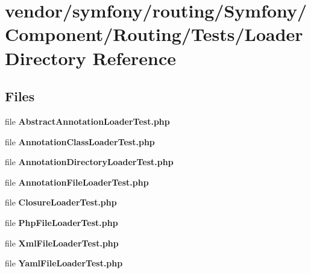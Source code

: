 \section{vendor/symfony/routing/\+Symfony/\+Component/\+Routing/\+Tests/\+Loader Directory Reference}
\label{dir_883c4e37e37910a8731378c3a2102f63}
\subsection*{Files}
\begin{DoxyCompactItemize}
\item 
file {\bf Abstract\+Annotation\+Loader\+Test.\+php}
\item 
file {\bf Annotation\+Class\+Loader\+Test.\+php}
\item 
file {\bf Annotation\+Directory\+Loader\+Test.\+php}
\item 
file {\bf Annotation\+File\+Loader\+Test.\+php}
\item 
file {\bf Closure\+Loader\+Test.\+php}
\item 
file {\bf Php\+File\+Loader\+Test.\+php}
\item 
file {\bf Xml\+File\+Loader\+Test.\+php}
\item 
file {\bf Yaml\+File\+Loader\+Test.\+php}
\end{DoxyCompactItemize}
